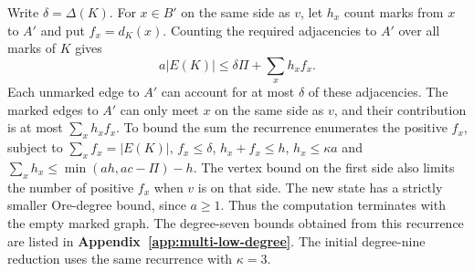 Write $\delta=\Delta(K)$. For $x\in B'$ on the same side
as $v$, let $h_x$ count marks from $x$ to $A'$ and put
$f_x=d_K(x)$. Counting the required adjacencies to $A'$
over all marks of $K$ gives
\[
 a|E(K)|\le\delta\Pi+\sum_x h_xf_x.
\]
Each unmarked edge to $A'$ can account for at most
$\delta$ of these adjacencies. The marked edges to $A'$
can only meet $x$ on the same side as $v$, and their
contribution is at most $\sum_x h_x f_x$. To bound the sum
the recurrence enumerates the positive $f_x$, subject to
$\sum_x f_x=|E(K)|$, $f_x\le\delta$, $h_x+f_x\le h$,
$h_x\le\kappa a$ and $\sum_x h_x\le\min(ah,ac-\Pi)-h$.
The vertex bound on the first side also limits the
number of positive $f_x$ when $v$ is on that side. The
new state has a strictly smaller Ore-degree bound, since $a\geq1$.
Thus the computation terminates with the empty marked graph.
The degree-seven bounds obtained from this recurrence are listed
in \textbf{Appendix~\ref{app:multi-low-degree}}. The initial degree-nine
reduction uses the same recurrence with $\kappa=3$.
